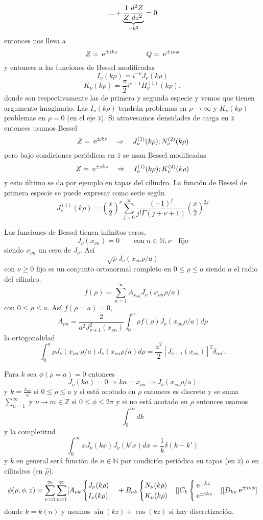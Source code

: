 \documentclass[10pt,oneside]{CBFT_book}
\begin{document}
\[
	... + \underbrace{\frac{1}{Z} \dtot[2]{Z}{z}}_{-k^2} =  0
\]
entonces nos lleva a
\[
	Z = \euler^{\pm i k z} \qquad \qquad Q = \euler^{\pm i \nu \phi}
\]
y entonces a las funciones de Bessel modificadas
\[
	I_\nu(k\rho) = i^{-\nu} J_\nu(k\rho)
\]
\[
	K_\nu(k\rho) = \frac{\pi}{2}i^{\nu+1} H_\nu^{(1)}(k\rho),
\]
donde son respectivamente las de primera y segunda especie y vemos que tienen argumento imaginario.
Las $I_\nu(k\rho)$ tendrán problemas en $\rho\to\infty$ y $K_\nu(k\rho)$ problemas en $\rho=0$ (en el eje 
$\hat{z}$).
Si atravesamos densidades de carga en $\hat{z}$ entonces usamos Bessel
\[
	Z = \euler^{\pm k z} \quad \Rightarrow \quad J_\nu^{(1)}(k\rho) ; N_\nu^{(2)}(k\rho)
\]
pero bajo condiciones periódicas en $\hat{z}$ se usan Bessel modificadas
\[
	Z = \euler^{ \pm i k z} \quad \Rightarrow \quad I_\nu^{(1)}(k\rho) ; K_\nu^{(2)}(k\rho)
\]
y esto último se da por ejemplo en tapas del cilindro.
La función de Bessel de primera especie se puede expresar como serie según
\[
	J_\nu^{(1)}(k\rho) = \left(\frac{x}{2}\right)^\nu \sum_{j=0}^\infty \frac{(-1)^j}{j!\Gamma(j+\nu +1)} 
		\left(\frac{x}{2}\right)^{2j}
\]

Las funciones de Bessel tienen infinitos ceros,
\[
	J_\nu(x_{\nu n}) = 0 \qquad \mathrm{con} \; n\in\mathbb{N}, \nu \quad \mathrm{fijo} 
\]
siendo $x_{\nu n}$ un cero de $J_\nu$. Así
\[
	\sqrt{\rho} J_\nu(x_{\nu n} \rho/a) 
\]
con $\nu \geq 0$ fijo es un conjunto ortonormal completo en $0 \leq \rho \leq a$ siendo $a$ el radio del 
cilindro.
\[
	f(\rho) = \sum_{n=1}^{\infty}  A_{x_{\nu n}} J_{\nu}( x_{\nu n} \rho/a )
\]
con $0 \leq \rho \leq a$. Así $f(\rho=a)=0$,
\[
	A_{\nu n} = \frac{2}{a^2 J_{\nu +1}^2 (x_{\nu n})} \int_0^a \rho f(\rho) J_\nu (x_{\nu n} \rho/a) 
	d\rho
\]
la ortogonalidad
\[
	\int_0^a \rho  J_\nu (x_{\nu n'} \rho/a)  J_\nu (x_{\nu n} \rho/a)  d\rho = 
	\frac{a^2}{2}[J_{\nu+1}(x_{\nu n})]^2 \delta_{nn'}.
\]

Para $k$ sea $\phi(\rho=a)=0$ entonces 
\[
	J_\nu(ka) = 0 \Rightarrow ka=x_{\nu n} \Rightarrow J_\nu (x_{\nu n} \rho/a)
\]
y $k=\frac{x_{\nu n}}{a}$ si $0\leq \rho \leq a$ y si está acotado en $\rho$ entonces es discreto y se
suma $\sum_{n=1}^\infty$ y $\nu\to m \in \mathbb{Z}$ si $0 \leq \phi \leq 2\pi$ y si no está acotado en
$\rho$ entonces usamos 
\[
	\int_0^\infty dk
\]
y la completitud
\[
	\int_0^\infty x J_\nu(kx) J_\nu(k'x) dx = \frac{1}{k} \delta (k-k')
\]
y $k$ en general será función de $n\in \mathbb{N}$ por condición periódica en tapas (en $\hat{z}$) o en
cilindros (en $\hat{\rho}$).
\[
	\phi(\rho,\phi,z) = \sum_{\nu=0}^\infty \sum_{n=1}^\infty
	[A_{\nu k}\begin{cases} J_\nu(k\rho)  \\ I_\nu(k\rho) \end{cases} + 
	B_{\nu k} \begin{cases} N_\nu(k\rho)  \\ K_\nu(k\rho) \end{cases} ]
	[C_k \begin{cases} \euler^{\pm kz} \\ \euler^{\pm ikz} \end{cases}]
	[D_{k\nu} \euler^{\pm i \nu \phi}]
\]
donde $k=k(n)$ y usamos $\sin(kz)+\cos(kz)$ si hay discretización.



\end{document}

